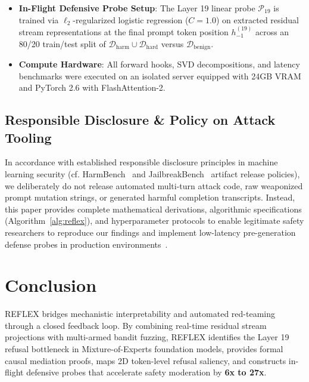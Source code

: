 \documentclass[manuscript,screen,review,anonymous]{acmart}
\begin{document}
\begin{itemize}[leftmargin=*]
    \item \textbf{In-Flight Defensive Probe Setup}: The Layer 19 linear probe $\mathcal{P}_{19}$ is trained via $\ell_2$-regularized logistic regression ($C=1.0$) on extracted residual stream representations at the final prompt token position $h_{-1}^{(19)}$ across an 80/20 train/test split of $\mathcal{D}_{\text{harm}} \cup \mathcal{D}_{\text{hard}}$ versus $\mathcal{D}_{\text{benign}}$.
    \item \textbf{Compute Hardware}: All forward hooks, SVD decompositions, and latency benchmarks were executed on an isolated server equipped with 24GB VRAM and PyTorch 2.6 with FlashAttention-2.
\end{itemize}

\subsection{Responsible Disclosure \& Policy on Attack Tooling}
In accordance with established responsible disclosure principles in machine learning security (cf. HarmBench~\cite{mazeika2024harmbench} and JailbreakBench~\cite{chao2024jailbreakbench} artifact release policies), we deliberately do not release automated multi-turn attack code, raw weaponized prompt mutation strings, or generated harmful completion transcripts. Instead, this paper provides complete mathematical derivations, algorithmic specifications (Algorithm~\ref{alg:reflex}), and hyperparameter protocols to enable legitimate safety researchers to reproduce our findings and implement low-latency pre-generation defense probes in production environments~\cite{casper2023red,perez2022red}.

\section{Conclusion}
REFLEX bridges mechanistic interpretability and automated red-teaming through a closed feedback loop. By combining real-time residual stream projections with multi-armed bandit fuzzing, REFLEX identifies the Layer 19 refusal bottleneck in Mixture-of-Experts foundation models, provides formal causal mediation proofs, maps 2D token-level refusal saliency, and constructs in-flight defensive probes that accelerate safety moderation by \textbf{6x to 27x}.



\end{document}
